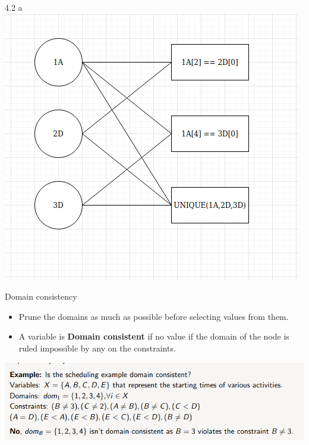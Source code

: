 \documentclass[11pt]{beamer}
\begin{document}
\begin{frame}{4.2 a}
\pause
\includegraphics[scale=0.5]{images/42graph.png}
\end{frame}

\begin{frame}{Domain consistency}
\pause
\begin{itemize}
	\item Prune the domains as much as possible before selecting values from them.\pause
	\item A variable is \textbf{Domain consistent} if no value if the domain of the node is ruled impossible by any on the constraints.\pause
\end{itemize}
\includegraphics[scale=0.4]{images/dcexample.png}
\end{frame}
\end{document}
